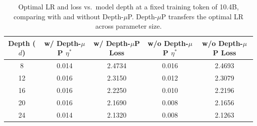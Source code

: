 \documentclass{article}
\begin{document}
\begin{table}[H]
\centering
\caption{Validation loss vs.\ LR across model depth at a fixed token budget of 10.4B with Depth-$\mu$P.}
\label{tab:depth-scaling-mup}
\vspace{0.1cm}
\end{table}

\begin{table}[H]
\centering
\caption{Optimal LR and loss vs.\ model depth at a fixed training token of 10.4B, comparing with and without Depth-$\mu$P. Depth-$\mu$P transfers the optimal LR across parameter size.}
\label{tab:depth-mup}
\vspace{0.1cm}
\begin{tabular}{ccccc}
\toprule
\textbf{Depth ($d$)} & \textbf{w/ Depth-$\mu$P $\eta^*$} & \textbf{w/ Depth-$\mu$P Loss} & \textbf{w/o Depth-$\mu$P $\eta^*$} & \textbf{w/o Depth-$\mu$P Loss} \\
\midrule
8  & 0.014 & 2.4734 & 0.016 & 2.4693 \\
12 & 0.016 & 2.3150 & 0.012 & 2.3079 \\
16 & 0.016 & 2.2250 & 0.010 & 2.2196 \\
20 & 0.016 & 2.1690 & 0.008 & 2.1656 \\
24 & 0.014 & 2.1320 & 0.008 & 2.1263 \\
\bottomrule
\end{tabular}
\end{table}
\end{document}
